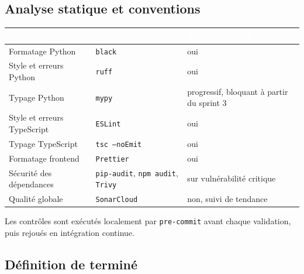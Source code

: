 \documentclass[11pt,a4paper]{article}
\newcommand{\hd}[1]{\textcolor{white}{\sffamily\bfseries\small #1}}
\newcommand{\rowhead}{\rowcolor{primary}}
\begin{document}
\subsection{Analyse statique et conventions}

\noindent
\begin{tabularx}{\textwidth}{@{}R{4.6cm} L C{2.6cm}@{}}
\toprule
\rowhead \hd{Domaine} & \hd{Outil} & \hd{Bloquant en CI} \\
\midrule
Formatage Python & \texttt{black} & oui \\
Style et erreurs Python & \texttt{ruff} & oui \\
Typage Python & \texttt{mypy} & progressif, bloquant à partir du sprint 3 \\
Style et erreurs TypeScript & \texttt{ESLint} & oui \\
Typage TypeScript & \texttt{tsc --noEmit} & oui \\
Formatage frontend & \texttt{Prettier} & oui \\
Sécurité des dépendances & \texttt{pip-audit}, \texttt{npm audit}, \texttt{Trivy} & sur vulnérabilité critique \\
Qualité globale & \texttt{SonarCloud} & non, suivi de tendance \\
\bottomrule
\end{tabularx}

\vspace{2mm}
Les contrôles sont exécutés localement par \texttt{pre-commit} avant chaque validation,
puis rejoués en intégration continue.

\subsection{Définition de terminé}
\end{document}
